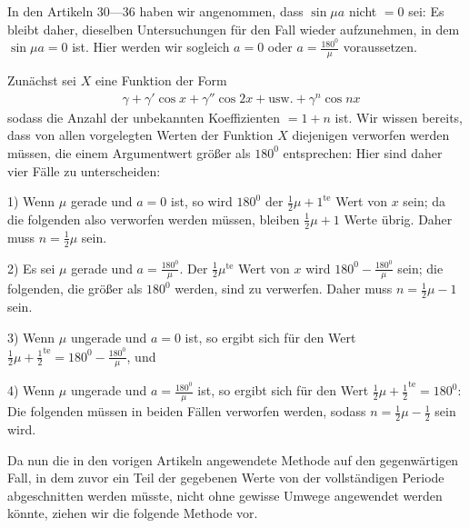 \begingroup
\renewcommand{\arraystretch}{1.45}

In den Artikeln 30---36 haben wir angenommen, dass $\sin\mu a$ nicht $=0$ sei: Es bleibt daher, dieselben Untersuchungen für den Fall wieder aufzunehmen, in dem $\sin\mu a=0$ ist. Hier werden wir sogleich $a=0$ oder $a=\frac{180^{\mathord{0}}}{\mu}$ voraussetzen.
\par Zunächst sei $X$ eine Funktion der Form
\[
\begin{aligned}
&\gamma+\gamma'\cos x+\gamma''\cos2x+\mathrm{usw.}+\gamma^n\cos nx
\end{aligned}
\]
sodass die Anzahl der unbekannten Koeffizienten $=1+n$ ist. Wir wissen bereits, dass von allen vorgelegten Werten der Funktion $X$ diejenigen verworfen werden müssen, die einem Argumentwert größer als $180^{\mathord{0}}$ entsprechen: Hier sind daher vier Fälle zu unterscheiden:

1) Wenn $\mu$ gerade und $a=0$ ist, so wird $180^{\mathord{0}}$ der $\frac12\mu+1^{\mathrm{te}}$ Wert von $x$ sein; da die folgenden also verworfen werden müssen, bleiben $\frac12\mu+1$ Werte übrig. Daher muss $n=\frac12\mu$ sein.

2) Es sei $\mu$ gerade und $a=\frac{180^{\mathord{0}}}{\mu}$. Der $\frac12\mu^{\mathrm{te}}$ Wert von $x$ wird $180^{\mathord{0}}-\frac{180^{\mathord{0}}}{\mu}$ sein; die folgenden, die größer als $180^{\mathord{0}}$ werden, sind zu verwerfen. Daher muss $n=\frac12\mu-1$ sein.

3) Wenn $\mu$ ungerade und $a=0$ ist, so ergibt sich für den Wert $\frac12\mu+\frac12^{\mathrm{te}}=180^{\mathord{0}}-\frac{180^{\mathord{0}}}{\mu}$, und

4) Wenn $\mu$ ungerade und $a=\frac{180^{\mathord{0}}}{\mu}$ ist, so ergibt sich für den Wert $\frac12\mu+\frac12^{\mathrm{te}}=180^{\mathord{0}}$: Die folgenden müssen in beiden Fällen verworfen werden, sodass $n=\frac12\mu-\frac12$ sein wird.

Da nun die in den vorigen Artikeln angewendete Methode auf den gegenwärtigen Fall, in dem zuvor ein Teil der gegebenen Werte von der vollständigen Periode abgeschnitten werden müsste, nicht ohne gewisse Umwege angewendet werden könnte, ziehen wir die folgende Methode vor.

